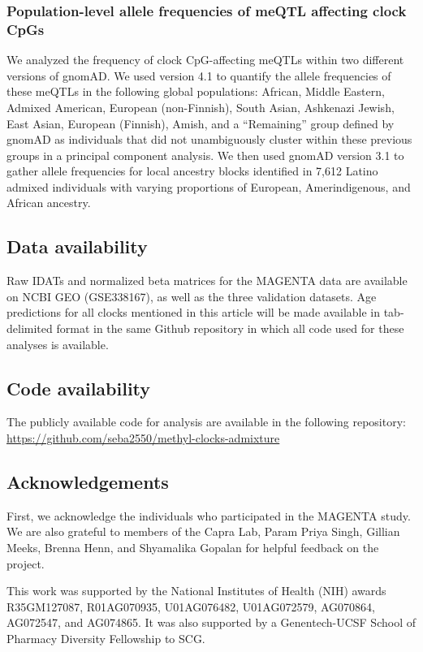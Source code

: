 \subsubsection*{Population-level allele frequencies of meQTL affecting clock CpGs}
We analyzed the frequency of clock CpG-affecting meQTLs within two different versions of gnomAD. We used version 4.1 to quantify the allele frequencies of these meQTLs in the following global populations: African, Middle Eastern, Admixed American, European (non-Finnish), South Asian, Ashkenazi Jewish, East Asian, European (Finnish), Amish, and a ``Remaining'' group defined by gnomAD as individuals that did not unambiguously cluster within these previous groups in a principal component analysis. We then used gnomAD version 3.1 to gather allele frequencies for local ancestry blocks identified in 7,612 Latino admixed individuals with varying proportions of European, Amerindigenous, and African ancestry.


\subsection{Data availability}
Raw IDATs and normalized beta matrices for the MAGENTA data are available on NCBI GEO (GSE338167), as well as the three validation datasets. Age predictions for all clocks mentioned in this article will be made available in tab-delimited format in the same Github repository in which all code used for these analyses is available.

\subsection{Code availability}
The publicly available code for analysis are available in the following repository: \url{https://github.com/seba2550/methyl-clocks-admixture}

\subsection{Acknowledgements}
First, we acknowledge the individuals who participated in the MAGENTA study. We are also grateful to members of the Capra Lab, Param Priya Singh, Gillian Meeks, Brenna Henn, and Shyamalika Gopalan for helpful feedback on the project.

This work was supported by the National Institutes of Health (NIH) awards R35GM127087, R01AG070935, U01AG076482, U01AG072579, AG070864, AG072547, and AG074865. It was also supported by a Genentech-UCSF School of Pharmacy Diversity Fellowship to SCG.

